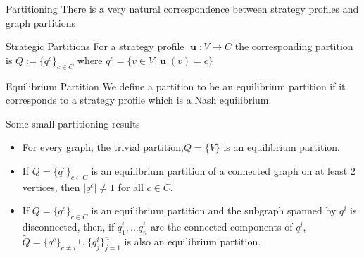 \documentclass{beamer}
\DeclareMathOperator{\uu}{\mathbf{u}}
\begin{document}
\begin{frame}{Partitioning}
	There is a very natural correspondence between strategy profiles and graph partitions 
	\begin{block}{Strategic Partitions}
		For a strategy profile $\uu:V\rightarrow C$ the corresponding partition is $Q:=\{q^c\}_{c\in C}$ where $q^c=\{v\in V|\uu(v)=c\}$
	\end{block}  
	\begin{block}{Equilibrium Partition}
		We define a partition to be an equilibrium partition if it corresponds to a strategy profile which is a Nash equilibrium. 
	\end{block}
\end{frame}
\begin{frame}{Some small partitioning results}
	\begin{itemize}
		\item For every graph, the trivial partition,$Q=\{V\}$ is an equilibrium partition.
		\item If $Q=\{q^c\}_{c\in C}$ is an equilibrium partition of a connected graph on at least 2 vertices, then $|q^c|\neq 1$ for all $c\in C$. 
		\item If $Q=\{q^c\}_{c\in C}$ is an equilibrium partition and the subgraph spanned by $q^i$ is disconnected, then, if $q^i_1,...q^i_n$ are the connected components of $q^i$, $\tilde{Q}=\{q^c\}_{c\neq i}\cup \{q^i_j\}_{j=1}^n$ is also an equilibrium partition. 
	\end{itemize}
\end{frame}
\end{document}
